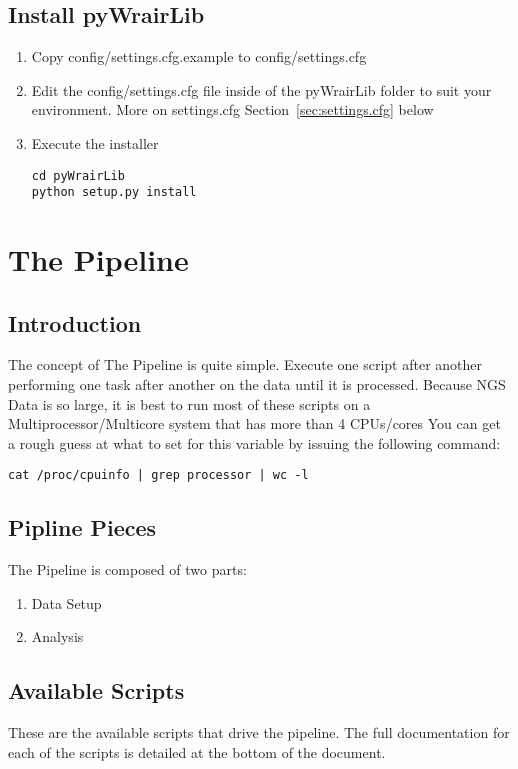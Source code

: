 \documentclass{article}
\begin{document}
\subsection{Install pyWrairLib}
\begin{enumerate}
 \item Copy config/settings.cfg.example to config/settings.cfg
 \item Edit the config/settings.cfg file inside of the pyWrairLib folder to suit your environment. More on settings.cfg Section~\ref{sec:settings.cfg} below
 \item Execute the installer
\begin{lstlisting}
cd pyWrairLib
python setup.py install
\end{lstlisting}
\end{enumerate}

\section{The Pipeline}

\subsection{Introduction}
The concept of The Pipeline is quite simple. Execute one script after another performing one task after another on the data until it is processed. Because NGS Data is so large, it is best to run most of these scripts on a Multiprocessor/Multicore system that has more than 4 CPUs/cores
You can get a rough guess at what to set for this variable by issuing the following command:
\begin{lstlisting}
cat /proc/cpuinfo | grep processor | wc -l
\end{lstlisting}

\subsection{Pipline Pieces}
The Pipeline is composed of two parts:
\begin{enumerate}
\item Data Setup
\item Analysis
\end{enumerate}

\subsection{Available Scripts}
These are the available scripts that drive the pipeline.
The full documentation for each of the scripts is detailed at the bottom of the document.
\end{document}
